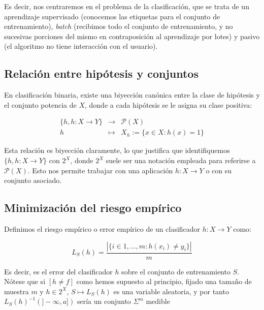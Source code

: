Es decir, nos centraremos en el problema de la clasificación, que se trata de un aprendizaje supervisado (conocemos las etiquetas para
el conjunto de entrenamiento), \emph{batch} (recibimos todo el conjunto de entrenamiento, y no sucesivas porciones del mismo en
contraposición al aprendizaje por lotes) y pasivo (el algoritmo no tiene interacción con el usuario).

\subsection{Relación entre hipótesis y conjuntos}
\label{biyeccion-canonica} 
En clasificación binaria, existe una biyección canónica entre la clase de hipótesis y el conjunto potencia de $X$, donde
a cada hipótesis se le asigna su clase positiva:

\begin{equation*}
 \begin{array}{rcl} 
  \{h, h:X \rightarrow Y\} & \longrightarrow & \mathcal{P}(X) \\
  h & \longmapsto & X_h := \{x\in X: h(x) = 1\}
 \end{array}
\end{equation*}

Esta relación es biyección claramente, lo que justifica que identifiquemos $\{h, h:X \rightarrow Y\}$ con $2^X$, donde $2^X$ 
suele ser una notación empleada para referirse a $\mathcal{P}(X)$. Esto nos permite trabajar con una aplicación
$h:X \rightarrow Y$ o con su conjunto asociado.

\subsection{Minimización del riesgo empírico}

\begin{definition}
Definimos el riesgo empírico o error empírico de un clasificador $h:X \rightarrow Y$ como:

\[L_S(h) = \frac{|\{i\in {1,\ldots, m}: h(x_i) \neq y_i\}|}{m}\]

\end{definition}

Es decir, es el error del clasificador $h$ sobre el conjunto de entrenamiento $S$. Nótese que si $[h\neq f]$ como hemos
supuesto al principio, fijado una tamaño de muestra $m$ y $h\in 2^X$, $S \mapsto L_S(h)$ es una variable aleatoria, y por
tanto $L_S(h)^{-1}(]-\infty, a])$ sería un conjunto $\Sigma^m$ medible

